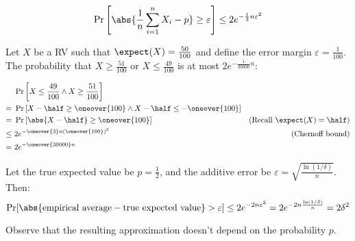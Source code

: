 \begin{equation}
    \Pr\left[\abs{\frac{1}{n}\sum_{i = 1}^{n} X_i - p} \geq \varepsilon\right] \leq 2e^{-\frac{1}{3}n\varepsilon^2}
\end{equation}


\ex Let $X$ be a RV such that $\expect(X) = \frac{50}{100}$ and define the error margin $\varepsilon = \frac{1}{100}$. The probability that $X \geq \frac{51}{100}$ or $X \leq \frac{49}{100}$ is at most $2e^{-\frac{1}{30000}n}$:

\begin{align*}
        &\ \Pr\left[X \leq \frac{49}{100} \wedge X \geq \frac{51}{100}\right]                 & \\
       =&\ \Pr\left[X - \half \geq \oneover{100} \wedge X - \half \leq - \oneover{100}\right] & \\
       =&\ \Pr\left[\abs{X - \half} \geq \oneover{100}\right]                                 & \text{(Recall } \expect(X) = \half)\\
    \leq&\ 2e^{-\oneover{3} n \left(\oneover{100}\right)^2}                                   & \text{(Chernoff bound)} \\
       =&\ 2e^{-\oneover{30000}n}
\end{align*}
    
\ex Let the true expected value be $p = \frac{1}{2}$, and the additive error be $\varepsilon = \sqrt{\frac{\ln(1/\delta)}{n}}$. Then:
\[
    \Pr[\abs{\text{empirical average} - \text{true expected value}} > \varepsilon] \leq 2e^{-2n\varepsilon^2} = 2e^{-2n \frac{\ln(1/\delta)}{n}} = 2 \delta^2
\]
    
Observe that the resulting approximation doesn't depend on the probability $p$.
